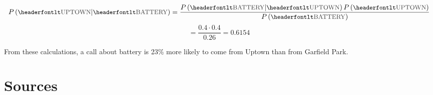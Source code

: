\documentclass[11pt]{article}
\newcommand{\printsubsection}[1]{\normalfont\headerfontlt\textcolor{darkgray}{{#1}}}
\newcommand{\opns}[1]{\textrm{\small\printsubsection{\MakeUppercase{#1}}}}
\begin{document}
$$ P\left(\opns{UPTOWN} \middle\vert \opns{BATTERY} \right) = \frac{P\left( \opns{BATTERY} \middle\vert \opns{UPTOWN}\right) P\left( \opns{UPTOWN}\right) }{P\left(\opns{BATTERY}\right)}$$
$$ = \frac{0.4\cdot 0.4}{0.26} = 0.6154 $$

From these calculations, a call about battery is 23\% more likely to come from Uptown than from Garfield Park.

\section*{Sources}
\end{document}
